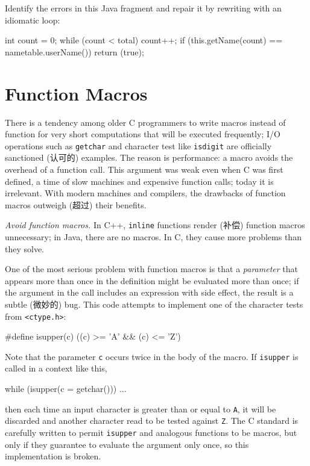 \begin{exercise}
    Identify the errors in this Java fragment and repair it by rewriting
    with an idiomatic loop:
    \begin{badcode}
        int count = 0;
        while (count < total) {
            count++;
            if (this.getName(count) == nametable.userName()) {
                return (true);
            }
        }
    \end{badcode}
\end{exercise}

\section{Function Macros}
\label{sec:func_mac}
There is a tendency among older C programmers to write macros instead of
function for very short computations that will be executed frequently; I/O
operations such as \verb'getchar' and character test like \verb'isdigit'
are officially sanctioned (认可的) examples. The reason is performance: a
macro avoids the overhead of a function call. This argument was weak even
when C was first defined, a time of slow machines and expensive function
calls; today it is irrelevant. With modern machines and compilers, the
drawbacks of function macros outweigh (超过) their benefits.

\emph{Avoid function macros.} In C++, \verb'inline' functions render (补偿)
function macros unnecessary; in Java, there are no macros. In C, they cause
more problems than they solve.

One of the most serious problem with function macros is that a
\textit{parameter} that appears more than once in the definition might be
evaluated more than once; if the argument in the call includes an
expression with side effect, the result is a subtle (微妙的) bug. This code
attempts to implement one of the character tests from \verb'<ctype.h>':
\begin{badcode}
    #define isupper(c) ((c) >= 'A' && (c) <= 'Z')
\end{badcode}
Note that the parameter \verb'c' occurs twice in the body of the macro. If
\verb'isupper' is called in a context like this,
\begin{badcode}
    while (isupper(c = getchar()))
        ...
\end{badcode}
then each time an input character is greater than or equal to \verb'A', it
will be discarded and another character read to be tested against \verb'Z'.
The C standard is carefully written to permit \verb'isupper' and analogous
functions to be macros, but only if they guarantee to evaluate the argument
only once, so this implementation is broken.


